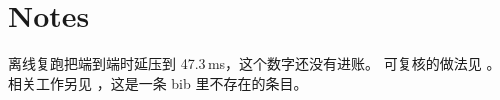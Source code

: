 \section{Notes}
\label{sec:notes}

离线复跑把端到端时延压到 47.3\,ms，这个数字还没有进账。
可复核的做法见 \cite{chen2023factscore}。
相关工作另见 \cite{ghost2024}，这是一条 bib 里不存在的条目。
